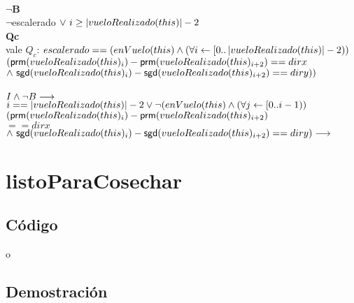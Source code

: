 \documentclass[a4paper]{article}
\begin{document}
        \\
        \textbf{$\neg$B}\\
        $\neg$escalerado$ \ \vee \ i \geq \left| vueloRealizado(this) \right| - 2$
        \\
        \textbf{Qc}\\
		vale $Q_c$: $ escalerado == (enVuelo(this) \land (\forall i \leftarrow [0..\left| vueloRealizado(this) \right| - 2)) $ $ (\mathsf{prm}(vueloRealizado(this)_i) - \mathsf{prm}(vueloRealizado(this)_{i+2}) == dirx $ $ \land \ \mathsf{sgd}(vueloRealizado(this)_i) - \mathsf{sgd}(vueloRealizado(this)_{i+2}) == diry)) $ \\
\\ $I \land \neg B \longrightarrow $\\
$i == \left| vueloRealizado(this) \right| -2 \vee \neg (enVuelo(this) \land (\forall j \leftarrow [0..i -1)) $\\ $ (\mathsf{prm}(vueloRealizado(this)_i) - \mathsf{prm}(vueloRealizado(this)_{i+2})$\\$ == dirx $ $ \land \ \mathsf{sgd}(vueloRealizado(this)_i) - \mathsf{sgd}(vueloRealizado(this)_{i+2}) == diry) \longrightarrow $\\
$ $
		     


\newpage

\section{listoParaCosechar}

    \subsection{C\'odigo}
    o

    \subsection{Demostraci\'on}
        \noindent
       
\end{document}
